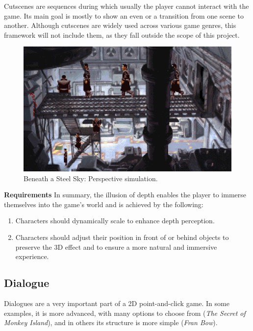 \begin{notImplemented}
 \par
\vspace{3mm}
Cutscenes are sequences during which usually the player cannot interact with the game. Its main goal is mostly to show an even or a transition from one scene to another. Although cutscenes are widely used across various game genres, this framework will not include them, as they fall outside the scope of this project.
\end{notImplemented}

\begin{figure}[H]
\centering
\includegraphics[width=.8\linewidth]{img/M-BaSS00.png}
\caption{Beneath a Steel Sky: Perspective simulation.}
\label{fig:M-BaSS0}
\end{figure}

\textbf{Requirements} \quad In summary, the illusion of depth enables the player to immerse themselves into the game's world and is achieved by the following:

\begin{enumerate}[label=\color{teal}\textbf{R{\arabic*}},resume]
  \item \label{intro:req:scale} Characters should dynamically scale to enhance depth perception.
  \item \label{intro:req:layers} Characters should adjust their position in front of or behind objects to preserve the 3D effect and to ensure a more natural and immersive experience.
\end{enumerate}
    
\subsection{Dialogue}
\label{sec:Dialogue}
Dialogues are a very important part of a 2D point-and-click game. In some examples, it is more advanced, with many options to choose from (\textit{The Secret of Monkey Island}), and in others its structure is more simple (\textit{Fran Bow}).  

